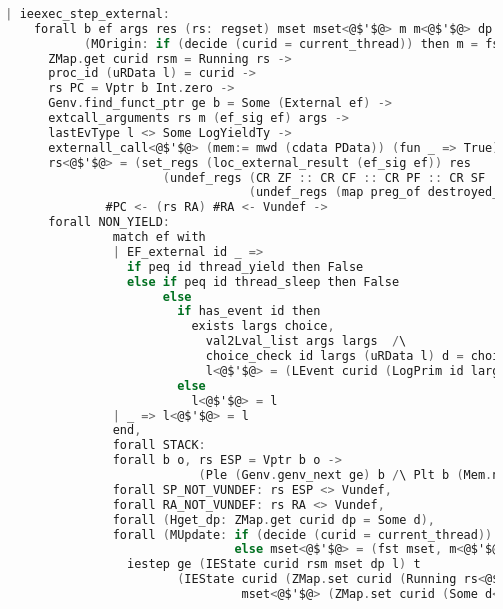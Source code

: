 \begin{lstlisting}[language=C]
                          
  | ieexec_step_external:
      forall b ef args res (rs: regset) mset mset<@$'$@> m m<@$'$@> dp d d<@$'$@> ds<@$'$@> t rs<@$'$@> curid rsm l l<@$'$@>
             (MOrigin: if (decide (curid = current_thread)) then m = fst mset else m = snd mset),
        ZMap.get curid rsm = Running rs ->
        proc_id (uRData l) = curid ->
        rs PC = Vptr b Int.zero ->
        Genv.find_funct_ptr ge b = Some (External ef) ->
        extcall_arguments rs m (ef_sig ef) args ->
        lastEvType l <> Some LogYieldTy ->
        externall_call<@$'$@> (mem:= mwd (cdata PData)) (fun _ => True) ef ge args (m, (uRData l, d)) t res (m<@$'$@>, (ds<@$'$@>,d<@$'$@>)) ->
        rs<@$'$@> = (set_regs (loc_external_result (ef_sig ef)) res 
                        (undef_regs (CR ZF :: CR CF :: CR PF :: CR SF :: CR OF :: nil)
                                    (undef_regs (map preg_of destroyed_at_call) rs))) 
                #PC <- (rs RA) #RA <- Vundef ->
        forall NON_YIELD: 
                 match ef with
                 | EF_external id _ => 
                   if peq id thread_yield then False
                   else if peq id thread_sleep then False
                        else
                          if has_event id then
                            exists largs choice,
                              val2Lval_list args largs  /\
                              choice_check id largs (uRData l) d = choice /\ 
                              l<@$'$@> = (LEvent curid (LogPrim id largs choice (snap_func d)) :: l) 
                          else
                            l<@$'$@> = l
                 | _ => l<@$'$@> = l
                 end,
                 forall STACK:
                 forall b o, rs ESP = Vptr b o ->
                             (Ple (Genv.genv_next ge) b /\ Plt b (Mem.nextblock m)),
                 forall SP_NOT_VUNDEF: rs ESP <> Vundef,
                 forall RA_NOT_VUNDEF: rs RA <> Vundef,
                 forall (Hget_dp: ZMap.get curid dp = Some d),
                 forall (MUpdate: if (decide (curid = current_thread)) then mset<@$'$@> = (m<@$'$@>, snd mset)
                                  else mset<@$'$@> = (fst mset, m<@$'$@>)),
                   iestep ge (IEState curid rsm mset dp l) t 
                          (IEState curid (ZMap.set curid (Running rs<@$'$@>) rsm) 
                                   mset<@$'$@> (ZMap.set curid (Some d<@$'$@>) dp) l<@$'$@>)

\end{lstlisting}

